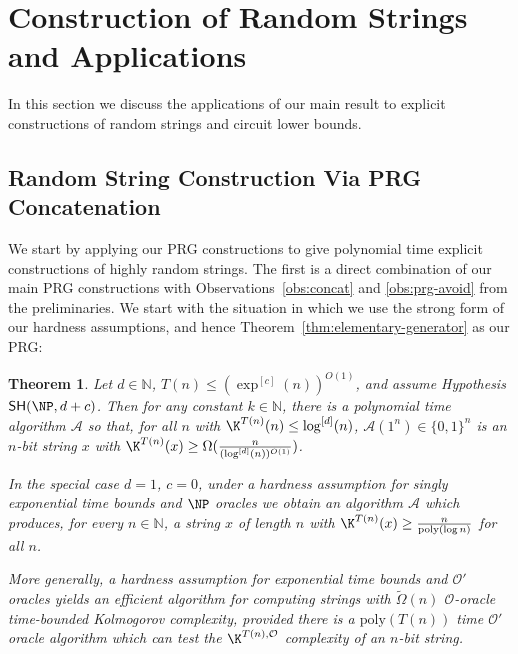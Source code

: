\documentclass[11pt]{article}
\newtheorem{theorem}{Theorem}
\newcommand{\B}{\{0,1\}}
\newcommand{\SH}{\mathsf{SH}}
\renewcommand{\poly}{\mathrm{poly}}
\begin{document}
\section{Construction of Random Strings and Applications}
In this section we discuss the applications of our main result to explicit constructions of random strings and circuit lower bounds.
\subsection{Random String Construction Via PRG Concatenation}
We start by applying our PRG constructions to give polynomial time explicit constructions of highly random strings. The first is a direct combination of our main PRG constructions with Observations~\ref{obs:concat} and \ref{obs:prg-avoid} from the preliminaries. We start with the situation in which we use the strong form of our hardness assumptions, and hence Theorem~\ref{thm:elementary-generator} as our PRG:
\begin{theorem}\label{thm:elementary-random-strings-ae}
Let $d \in \mathbb{N}$, $T(n) \leq (\exp^{[c]}(n))^{O(1)}$, and assume Hypothesis $\SH(\NP,d+c)$. Then for any constant $k\in \mathbb{N}$, there is a polynomial time algorithm $\mathcal{A}$ so that, for all $n$ with $\K^{T(n)}(n) \leq \log^{[d]}(n)$, $\mathcal{A}(1^n) \in \B^{n}$ is an $n$-bit string $x$ with $\K^{T(n)}(x) \geq \Omega(\frac{n}{(\log^{[d]}(n))^{O(1)}})$. 

In the special case $d = 1$, $c = 0$, under a hardness assumption for singly exponential time bounds and $\NP$ oracles we obtain an algorithm $\mathcal{A}$ which produces, for every $n \in \mathbb{N}$, a string $x$ of length $n$ with $\K^{T(n)}(x) \geq \frac{n}{\poly(\log n)}$ for all $n$.

More generally, a hardness assumption for exponential time bounds and $\mathcal{O'}$ oracles yields an efficient algorithm for computing strings with $\tilde{\Omega}(n)$ $\mathcal{O}$-oracle time-bounded Kolmogorov complexity, provided there is a $\poly(T(n))$ time $\mathcal{O'}$ oracle algorithm which can test the $\K^{T(n), \mathcal{O}}$ complexity of an $n$-bit string.
\end{theorem}
\end{document}

